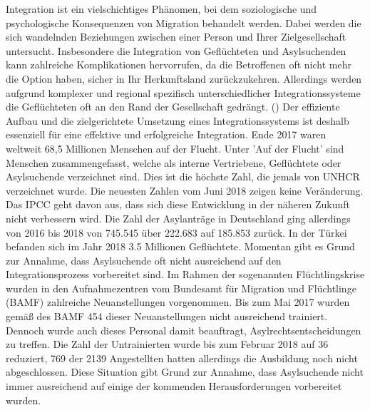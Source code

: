 

Integration ist ein vielschichtiges Phänomen, bei dem soziologische und psychologische Konsequenzen von Migration behandelt werden. Dabei werden die sich wandelnden Beziehungen zwischen einer Person und Ihrer Zielgesellschaft untersucht.\newline
Insbesondere die Integration von Geflüchteten und Asylsuchenden kann zahlreiche Komplikationen hervorrufen, da die Betroffenen oft nicht mehr die Option haben, sicher in Ihr Herkunftsland zurückzukehren.\newline
Allerdings werden aufgrund komplexer und regional spezifisch unterschiedlicher Integrationssysteme die Geflüchteten oft an den Rand der Gesellschaft gedrängt. (\cite{oduntan2017investigating})\newline
Der effiziente Aufbau und die zielgerichtete Umsetzung eines Integrationssystems ist deshalb essenziell für eine effektive und erfolgreiche Integration.\newline
Ende 2017 waren weltweit 68,5 Millionen Menschen auf der Flucht. Unter 'Auf der Flucht'  sind Menschen zusammengefasst, welche als interne Vertriebene, Gefl\"uchtete oder Asylsuchende verzeichnet sind. Dies ist die h\"ochste Zahl, die jemals von UNHCR verzeichnet wurde.\cite{uno2018flucht}
Die neuesten Zahlen vom Juni 2018 zeigen keine Ver\"anderung.\newline
Das IPCC geht davon aus, dass sich diese Entwicklung in der n\"aheren Zukunft nicht verbessern wird. \cite{sr15ipcc}\newline
Die Zahl der Asylantr\"age in Deutschland ging allerdings von 2016 bis 2018 von 745.545 \"uber 222.683 auf 185.853 zur\"uck. \cite{statistica2019asyl} In der T\"urkei befanden sich im Jahr 2018 3.5 Millionen Gefl\"uchtete.\newline
\newline
Momentan gibt es Grund zur Annahme, dass Asylsuchende oft nicht ausreichend auf den Integrationsprozess vorbereitet sind. \cite{oduntan2017information} \cite{gillespie2016mapping}\newline
Im Rahmen der sogenannten Fl\"uchtlingskrise wurden in den Aufnahmezentren vom {Bundesamt f\"ur Migration und Fl\"uchtlinge} (BAMF) zahlreiche Neuanstellungen vorgenommen. Bis zum Mai 2017 wurden gem\"a\ss{} des BAMF 454 dieser Neuanstellungen nicht ausreichend trainiert. Dennoch wurde auch dieses Personal damit beauftragt, Asylrechtsentscheidungen zu treffen.\newline
Die Zahl der Untrainierten wurde bis zum Februar 2018 auf 36 reduziert, 769 der 2139 Angestellten hatten allerdings die Ausbildung noch nicht abgeschlossen.\newline
Diese Situation gibt Grund zur Annahme, dass Asylsuchende nicht immer ausreichend auf einige der kommenden Herausforderungen vorbereitet wurden. \cite{asylum2018bamf}\newline



